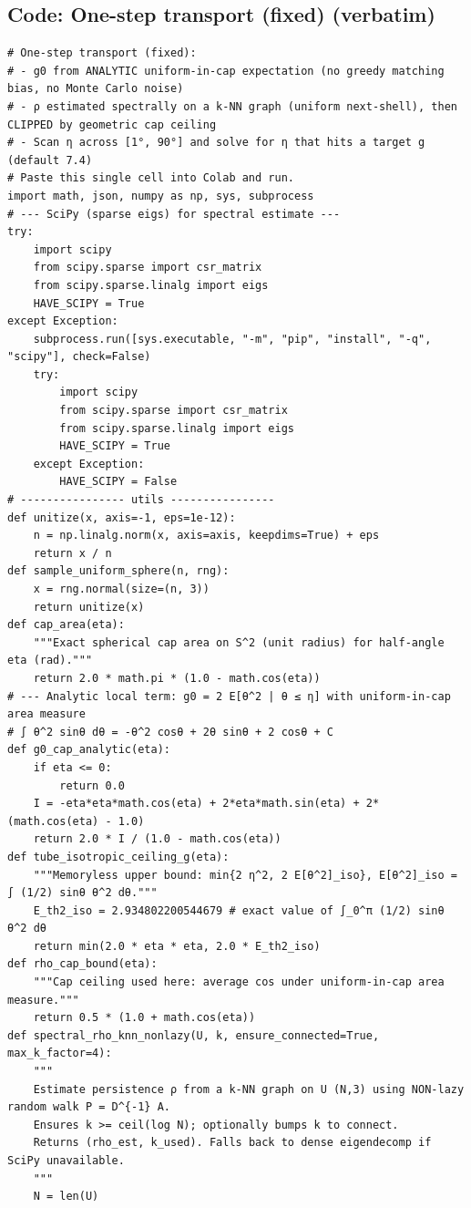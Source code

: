 \documentclass[11pt]{article}
\begin{document}
\subsection*{Code: One-step transport (fixed) (verbatim)}
\begin{verbatim}
# One-step transport (fixed):
# - g0 from ANALYTIC uniform-in-cap expectation (no greedy matching bias, no Monte Carlo noise)
# - ρ estimated spectrally on a k-NN graph (uniform next-shell), then CLIPPED by geometric cap ceiling
# - Scan η across [1°, 90°] and solve for η that hits a target g (default 7.4)
# Paste this single cell into Colab and run.
import math, json, numpy as np, sys, subprocess
# --- SciPy (sparse eigs) for spectral estimate ---
try:
    import scipy
    from scipy.sparse import csr_matrix
    from scipy.sparse.linalg import eigs
    HAVE_SCIPY = True
except Exception:
    subprocess.run([sys.executable, "-m", "pip", "install", "-q", "scipy"], check=False)
    try:
        import scipy
        from scipy.sparse import csr_matrix
        from scipy.sparse.linalg import eigs
        HAVE_SCIPY = True
    except Exception:
        HAVE_SCIPY = False
# ---------------- utils ----------------
def unitize(x, axis=-1, eps=1e-12):
    n = np.linalg.norm(x, axis=axis, keepdims=True) + eps
    return x / n
def sample_uniform_sphere(n, rng):
    x = rng.normal(size=(n, 3))
    return unitize(x)
def cap_area(eta):
    """Exact spherical cap area on S^2 (unit radius) for half-angle eta (rad)."""
    return 2.0 * math.pi * (1.0 - math.cos(eta))
# --- Analytic local term: g0 = 2 E[θ^2 | θ ≤ η] with uniform-in-cap area measure
# ∫ θ^2 sinθ dθ = -θ^2 cosθ + 2θ sinθ + 2 cosθ + C
def g0_cap_analytic(eta):
    if eta <= 0:
        return 0.0
    I = -eta*eta*math.cos(eta) + 2*eta*math.sin(eta) + 2*(math.cos(eta) - 1.0)
    return 2.0 * I / (1.0 - math.cos(eta))
def tube_isotropic_ceiling_g(eta):
    """Memoryless upper bound: min{2 η^2, 2 E[θ^2]_iso}, E[θ^2]_iso = ∫ (1/2) sinθ θ^2 dθ."""
    E_th2_iso = 2.934802200544679 # exact value of ∫_0^π (1/2) sinθ θ^2 dθ
    return min(2.0 * eta * eta, 2.0 * E_th2_iso)
def rho_cap_bound(eta):
    """Cap ceiling used here: average cos under uniform-in-cap area measure."""
    return 0.5 * (1.0 + math.cos(eta))
def spectral_rho_knn_nonlazy(U, k, ensure_connected=True, max_k_factor=4):
    """
    Estimate persistence ρ from a k-NN graph on U (N,3) using NON-lazy random walk P = D^{-1} A.
    Ensures k >= ceil(log N); optionally bumps k to connect.
    Returns (rho_est, k_used). Falls back to dense eigendecomp if SciPy unavailable.
    """
    N = len(U)

\end{verbatim}
\end{document}
